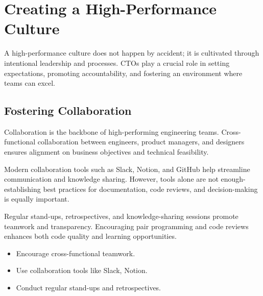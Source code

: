\section{Creating a High-Performance Culture}
A high-performance culture does not happen by accident; it is cultivated through intentional leadership and processes. CTOs play a crucial role in setting expectations, promoting accountability, and fostering an environment where teams can excel.

\subsection{Fostering Collaboration}
Collaboration is the backbone of high-performing engineering teams. Cross-functional collaboration between engineers, product managers, and designers ensures alignment on business objectives and technical feasibility.

Modern collaboration tools such as Slack, Notion, and GitHub help streamline communication and knowledge sharing. However, tools alone are not enough-establishing best practices for documentation, code reviews, and decision-making is equally important.

Regular stand-ups, retrospectives, and knowledge-sharing sessions promote teamwork and transparency. Encouraging pair programming and code reviews enhances both code quality and learning opportunities.

\begin{itemize}
    \item Encourage cross-functional teamwork.
    \item Use collaboration tools like Slack, Notion.
    \item Conduct regular stand-ups and retrospectives.
\end{itemize}

